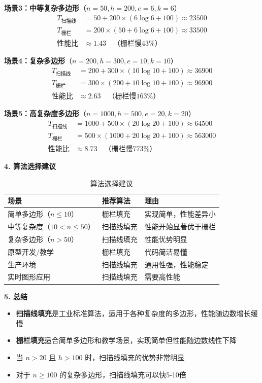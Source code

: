 ﻿\documentclass[12pt,a4paper]{article}
\begin{document}
\textbf{场景3：中等复杂多边形}（$n=50, h=200, e=6, k=6$）
\begin{align}
T_{扫描线} &= 50 + 200 \times (6 \log 6 + 100) \approx 23500 \\
T_{栅栏} &= 200 \times (50 + 6 \log 6 + 100) \approx 33500 \\
\text{性能比} &\approx 1.43 \quad \text{（栅栏慢43\%）}
\end{align}

\textbf{场景4：复杂多边形}（$n=200, h=300, e=10, k=10$）
\begin{align}
T_{扫描线} &= 200 + 300 \times (10 \log 10 + 100) \approx 36900 \\
T_{栅栏} &= 300 \times (200 + 10 \log 10 + 100) \approx 96900 \\
\text{性能比} &\approx 2.63 \quad \text{（栅栏慢163\%）}
\end{align}

\textbf{场景5：高复杂度多边形}（$n=1000, h=500, e=20, k=20$）
\begin{align}
T_{扫描线} &= 1000 + 500 \times (20 \log 20 + 100) \approx 64500 \\
T_{栅栏} &= 500 \times (1000 + 20 \log 20 + 100) \approx 563000 \\
\text{性能比} &\approx 8.73 \quad \text{（栅栏慢773\%）}
\end{align}

\textbf{4. 算法选择建议}

\begin{table}[H]
\centering
\begin{tabular}{|p{4cm}|p{4cm}|p{4cm}|}
\hline
\textbf{场景} & \textbf{推荐算法} & \textbf{理由} \\
\hline
简单多边形（$n \leq 10$） & 栅栏填充 & 实现简单，性能差异小 \\
\hline
中等复杂度（$10 < n \leq 50$） & 扫描线填充 & 性能开始显著优于栅栏 \\
\hline
复杂多边形（$n > 50$） & 扫描线填充 & 性能优势明显 \\
\hline
原型开发/教学 & 栅栏填充 & 代码简洁易懂 \\
\hline
生产环境 & 扫描线填充 & 通用性强，性能稳定 \\
\hline
实时图形应用 & 扫描线填充 & 需要高性能 \\
\hline
\end{tabular}
\caption{算法选择建议}
\end{table}

\textbf{5. 总结}

\begin{itemize}
\item \textbf{扫描线填充}是工业标准算法，适用于各种复杂度的多边形，性能随边数增长缓慢
\item \textbf{栅栏填充}适合简单多边形和教学场景，实现简单但性能随边数线性下降
\item 当 $n > 20$ 且 $h > 100$ 时，扫描线填充的优势非常明显
\item 对于 $n \geq 100$ 的复杂多边形，扫描线填充可以快5-10倍
\end{itemize}
\end{document}
